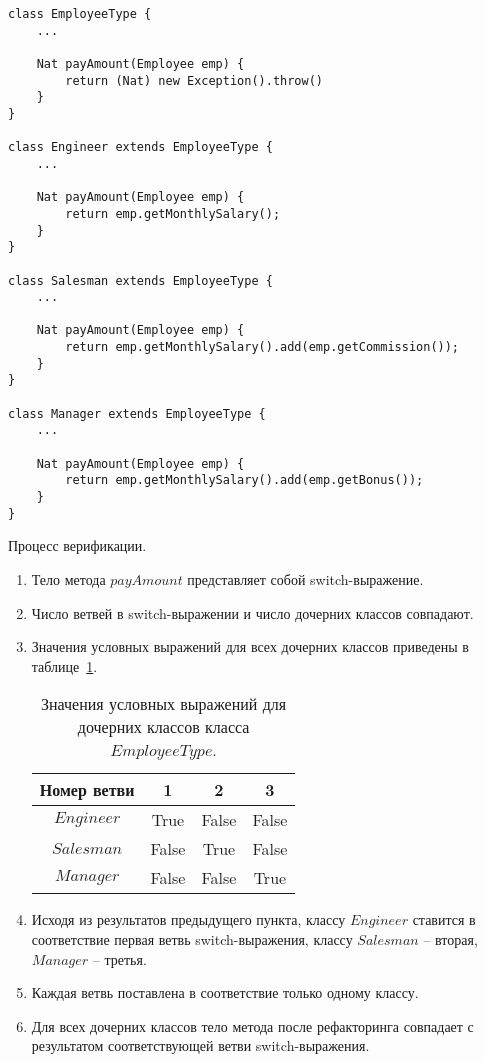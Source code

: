 \begin{lstlisting}[float,label=et-after,caption=Код после рефакторинга.]
class EmployeeType {
    ...

    Nat payAmount(Employee emp) {
        return (Nat) new Exception().throw()
    }
}

class Engineer extends EmployeeType {
    ...

    Nat payAmount(Employee emp) {
        return emp.getMonthlySalary();
    }
}

class Salesman extends EmployeeType {
    ...

    Nat payAmount(Employee emp) {
        return emp.getMonthlySalary().add(emp.getCommission());
    }
}

class Manager extends EmployeeType {
    ...

    Nat payAmount(Employee emp) {
        return emp.getMonthlySalary().add(emp.getBonus());
    }
}
\end{lstlisting}
Процесс верификации.

\begin{enumerate}
    \item Тело метода $payAmount$ представляет собой switch-выражение.
    \item Число ветвей в switch-выражении и число дочерних классов совпадают.
    \item Значения условных выражений для всех дочерних классов приведены в таблице~\ref{et-c}.
    \begin{table}[H]
    \begin{center}
    \begin{tabular}{|c|c|c|c|}
    \hline
    Номер ветви & 1 & 2 & 3\\
    \hline
    $Engineer$ & True & False & False\\
    \hline
    $Salesman$ & False & True & False\\
    \hline
    $Manager$ & False & False & True\\
    \hline
    \end{tabular}
    \end{center}
    \caption{Значения условных выражений для дочерних классов класса $EmployeeType$.}
    \label{et-c}
    \end{table}
    \item Исходя из результатов предыдущего пункта, классу $Engineer$ ставится в соответствие первая ветвь switch-выражения, классу $Salesman$ -- вторая, $Manager$ -- третья.
    \item Каждая ветвь поставлена в соответствие только одному классу.
    \item Для всех дочерних классов тело метода после рефакторинга совпадает с результатом соответствующей ветви switch-выражения.
\end{enumerate}
